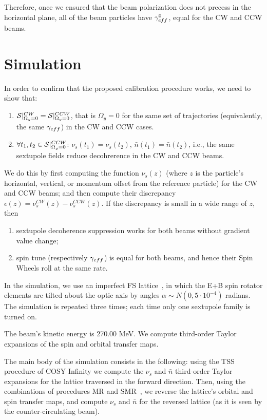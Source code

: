 \documentclass[a4paper]{jacow}
\newcommand{\W}{\Omega}
\newcommand{\nbar}{\bar n}
\begin{document}
Therefore, once we ensured that the beam polarization does not precess in the horizontal plane,
all of the beam particles have $\g*^0$, equal for the CW and CCW beams.

\section{Simulation}
In order to confirm that the proposed calibration procedure works, we need to show that:
\begin{enumerate}
\item $\Stab*^{CW} = \Stab*^{CCW}$, that is $\W_y=0$ for the same set of trajectories (equivalently,
  the same $\g*$) in the CW and CCW cases.
\item $\forall t_1,t_2\in\Stab*^{CCW}$: $\nu_s(t_1) = \nu_s(t_2)$, $\nbar(t_1) = \nbar(t_2)$, i.e., the same
  sextupole fields reduce decohrerence in the CW and CCW beams.
\end{enumerate}

We do this by first computing the function $\nu_s(z)$ (where $z$ is the particle's horizontal, vertical, or
momentum offset from the reference particle) for the CW and CCW beams; and then compute their discrepancy
$\epsilon(z) = \nu_s^{CW}(z) - \nu_s^{CCW}(z)$. If the discrepancy is small in a wide range of $z$, then
\begin{enumerate}
\item sextupole decoherence suppression works for both beams without gradient value change;
\item spin tune (respectively $\g*$) is equal for both beams, and hence their Spin Wheels roll at the
  same rate.
\end{enumerate}

In the simulation, we use an imperfect FS lattice~\cite{Senichev:ICAP15-MODBC4}, in which the E+B
spin rotator elements are tilted about the optic axis by angles $\alpha\sim N(0, 5\cdot 10^{-4})$ radians.
The simulation is repeated three times; each time only one sextupole family is turned on.

The beam's kinetic energy is 270.00 MeV. We compute third-order Taylor expansions of the
spin and orbital transfer maps.

The main body of the simulation consists in the following: using the TSS~\cite[p.~41]{COSYINF:BeamPhysMan}
procedure
of COSY Infinity we compute the $\nu_s$ and $\nbar$ third-order Taylor expansions for the lattice traversed
in the forward direction.
Then, using the combinations of procedures MR and SMR~\cite[p.~233]{Eremey:Thesis}, we reverse
the lattice's orbital and spin transfer maps, and compute $\nu_s$ and $\nbar$
for the reversed lattice (as it is seen by the counter-circulating beam).
\end{document}
